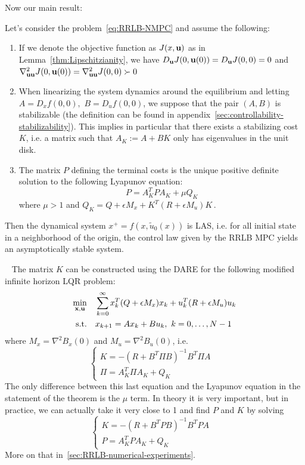 \documentclass[12pt]{article}
\begin{document}
\noindent Now our main result:

\begin{theorem}\label{thm:nominal-stability}
	Let's consider the problem~\ref{eq:RRLB-NMPC} and assume the following:
	\begin{enumerate}
		\item If we denote the objective function as $J(x,\bf{u})$ as in Lemma~\ref{thm:Lipschitzianity}, we have $D_\bf{u}J(0,\bf{u}(0))=D_\bf{u}J(0,0)=0$ and $\nabla^2_{\bf{u}\bf{u}}J(0,\bf{u}(0))=\nabla^2_{\bf{u}\bf{u}}J(0,0)\succ 0$

		\item When linearizing the system dynamics around the equilibrium and letting $A=D_xf(0,0),$ $B=D_uf(0,0)$, we suppose that the pair $(A,B)$ is stabilizable (the definition can be found in appendix~\ref{sec:controllability-stabilizability}).
		This implies in particular that there exists a stabilizing cost $K$, i.e. a matrix such that $A_K:=A+BK$ only has eigenvalues in the unit disk.

		\item The matrix $P$ defining the terminal costs is the unique positive definite solution to the following Lyapunov equation:
		\begin{equation*}
			P=A_K^TPA_K+\mu Q_K
		\end{equation*}
		where $\mu>1$ and $Q_K=Q+\epsilon M_x+K^T(R+\epsilon M_u)K$\,.
	\end{enumerate}
	Then the dynamical system $x^+=f(x,\tilde{u}_0(x))$ is LAS, i.e. for all initial state in a neighborhood of the origin, the control law given by the RRLB MPC yields an asymptotically stable system.
\end{theorem}

\begin{remark}~
	The matrix $K$ can be constructed using the DARE for the following modified infinite horizon LQR problem:
	\begin{align}
		\begin{split}\label{eq:inf-LQR}
			\underset{\bf{x},\bf{u}}{\min} &\quad \sum_{k=0}^\infty x_k^T(Q+\epsilon M_x)x_k+u_k^T(R+\epsilon M_u)u_k\\
			\text{s.t.} &\quad x_{k+1}=Ax_k+Bu_k,~k=0,\ldots,N-1\\
		\end{split}
	\end{align}
	where $M_x=\nabla^2B_x(0)$ and $M_u=\nabla^2B_u(0)$, i.e.
	$$\begin{cases}
		K=-(R+B^T\Pi B)^{-1}B^T\Pi A&\\
		\Pi=A_K^T\Pi A_K+Q_K
	\end{cases}$$
	The only difference between this last equation and the Lyapunov equation in the statement of the theorem is the $\mu$ term.
	In theory it is very important, but in practice, we can actually take it very close to 1 and find $P$ and $K$ by solving
	$$\begin{cases}
		K=-(R+B^TP B)^{-1}B^TP A&\\
		P=A_K^TP A_K+Q_K
	\end{cases}$$
	More on that in~\ref{sec:RRLB-numerical-experiments}.
\end{remark}
\end{document}
